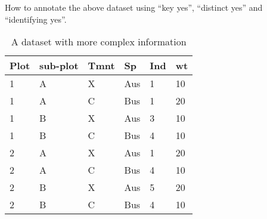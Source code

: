 \documentclass[10pt]{article}
\begin{document}
How to annotate the above dataset using ``key yes'', ``distinct yes''
and ``identifying yes''.


\begin{table}
\begin{center}
\begin{tabular}{|l|l|l|l|l|l|}
\hline
Plot & sub-plot & Tmnt & Sp & Ind &wt\\\hline
1 & A & X &Aus&1&10\\\hline
1 & A & C &Bus&1&20\\\hline
1 & B & X &Aus&3&10\\\hline
1 & B & C &Bus&4&10\\\hline
2 & A & X &Aus&1&20\\\hline
2 & A & C &Bus&4&10\\\hline
2 & B & X &Aus&5&20\\\hline
2 & B & C &Bus&4&10\\\hline
\end{tabular}
\end{center}
\caption{A dataset with more complex information}
\label{tb:complexdb}
\end{table}
\end{document}
